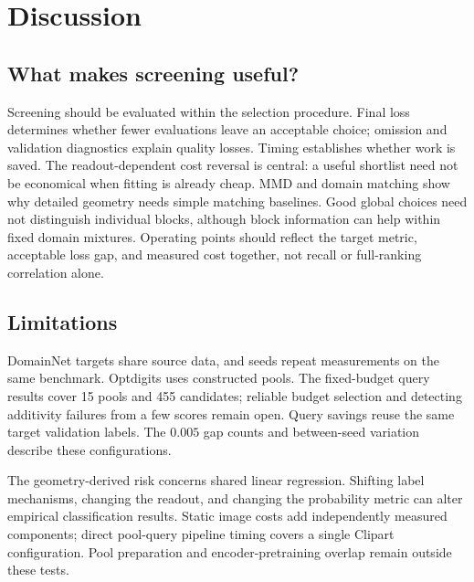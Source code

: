\section{Discussion}
\label{sec:discussion}
\subsection{What makes screening useful?}
Screening should be evaluated within the selection procedure. Final loss determines whether fewer evaluations leave an acceptable choice; omission and validation diagnostics explain quality losses. Timing establishes whether work is saved. The readout-dependent cost reversal is central: a useful shortlist need not be economical when fitting is already cheap.
MMD and domain matching show why detailed geometry needs simple matching baselines. Good global choices need not distinguish individual blocks, although block information can help within fixed domain mixtures. Operating points should reflect the target metric, acceptable loss gap, and measured cost together, not recall or full-ranking correlation alone.

\subsection{Limitations}
\label{sec:limitations}
DomainNet targets share source data, and seeds repeat measurements on the same benchmark. Optdigits uses constructed pools. The fixed-budget query results cover 15 pools and 455 candidates; reliable budget selection and detecting additivity failures from a few scores remain open. Query savings reuse the same target validation labels. The $0.005$ gap counts and between-seed variation describe these configurations.

The geometry-derived risk concerns shared linear regression. Shifting label mechanisms, changing the readout, and changing the probability metric can alter empirical classification results. Static image costs add independently measured components; direct pool-query pipeline timing covers a single Clipart configuration. Pool preparation and encoder-pretraining overlap remain outside these tests.

